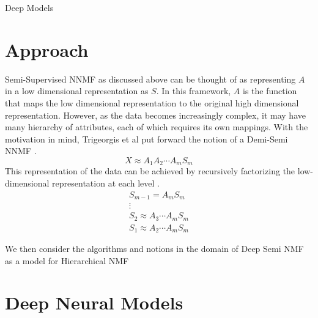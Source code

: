 \documentclass[12pt]{pom_thesis}
\begin{document}
\begin{chapter}{Deep Models}
\section{Approach}
Semi-Supervised NNMF as discussed above can be thought of as representing $A$ in a low dimensional representation as $S$. In this framework, $A$ is the function that maps the low dimensional representation to the original high dimensional representation. However, as the data becomes increasingly complex, it may have many hierarchy of attributes, each of which requires its own mappings. With the motivation in mind, Trigeorgis et al put forward the notion of a Demi-Semi NNMF \cite{trigeorgis2014deep}.
$$X \approx A_1A_2 \cdots A_m S_m$$
This representation of the data can be achieved by recursively factorizing the low-dimensional representation at each level \cite{trigeorgis2014deep}.
\begin{align*}
S_{m-1} = A_mS_m\\
\vdots \\
S_2  \approx A_3 \cdots A_m  S_m\\
S_1  \approx A_2 \cdots A_m  S_m
\end{align*}

We then consider the algorithms and notions in the domain of Deep Semi NMF as a model for Hierarchical NMF \cite{ deepNonNeg, trigeorgis2014deep} 
\section{Deep Neural Models}
	\end{chapter}
\end{document}
